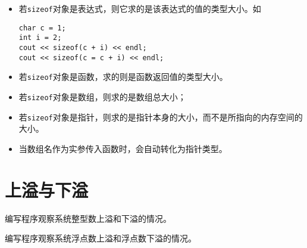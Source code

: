 \begin{frame}[fragile]\ft{\secname}
  \begin{itemize}
  \item 若\lstinline|sizeof|对象是表达式，则它求的是该表达式的值的类型大小。如
\begin{lstlisting}
char c = 1;
int i = 2;
cout << sizeof(c + i) << endl;
cout << sizeof(c = c + i) << endl;
\end{lstlisting}  
\item 若\lstinline|sizeof|对象是函数，求的则是函数返回值的类型大小。  
  \end{itemize}
\end{frame}


\begin{frame}[fragile]\ft{\secname}
  
\end{frame}

\begin{frame}[fragile]\ft{\secname}
\begin{itemize}
  \item 若\lstinline|sizeof|对象是数组，则求的是数组总大小；\\[.1in]
  \item 若\lstinline|sizeof|对象是指针，则求的是指针本身的大小，而不是所指向的内存空间的大小。\\[.1in]
  \item 当数组名作为实参传入函数时，会自动转化为指针类型。
  \end{itemize}
\end{frame}

\begin{frame}[fragile]\ft{\secname}
  
\end{frame}

\section{上溢与下溢}
\begin{frame}\ft{\secname}
\begin{biancheng} 
编写程序观察系统整型数上溢和下溢的情况。
\end{biancheng}
\end{frame}

\begin{frame}\ft{\secname}
\begin{biancheng} 
编写程序观察系统浮点数上溢和浮点数下溢的情况。
\end{biancheng}
\end{frame}




